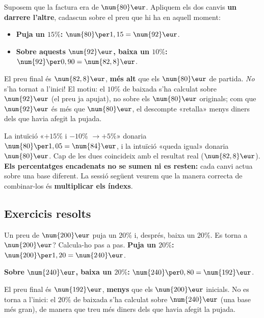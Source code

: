\begin{exemple}
Suposem que la factura era de $\num{80}\eur$. Apliquem els dos canvis \textbf{un
darrere l'altre}, cadascun sobre el preu que hi ha en aquell moment:
\begin{itemize}[leftmargin=1.4em, itemsep=2pt]
  \item \textbf{Puja un $15\%$:} $\num{80}\per 1,15=\num{92}\eur$.
  \item \textbf{Sobre aquests $\num{92}\eur$, baixa un $10\%$:}
        $\num{92}\per 0,90=\num{82,8}\eur$.
\end{itemize}
El preu final és $\num{82,8}\eur$, \textbf{més alt} que els $\num{80}\eur$ de partida.
\emph{No} s'ha tornat a l'inici! El motiu: el $10\%$ de baixada s'ha calculat sobre
$\num{92}\eur$ (el preu ja apujat), no sobre els $\num{80}\eur$ originals; com que
$\num{92}\eur$ és més que $\num{80}\eur$, el descompte «retalla» menys diners dels que
havia afegit la pujada.
\end{exemple}

\begin{exemple}
La intuïció «$+15\%$ i $-10\%$ $\rightarrow +5\%$» donaria
$\num{80}\per 1,05=\num{84}\eur$, i la intuïció «queda igual» donaria $\num{80}\eur$.
Cap de les dues coincideix amb el resultat real ($\num{82,8}\eur$). \textbf{Els
percentatges encadenats no se sumen ni es resten:} cada canvi actua sobre una base
diferent. La sessió següent veurem que la manera correcta de combinar-los és
\textbf{multiplicar els índexs}.
\end{exemple}

\subsection{Exercicis resolts}

\begin{exresolt}
Un preu de $\num{200}\eur$ puja un $20\%$ i, després, baixa un $20\%$. Es torna a
$\num{200}\eur$? Calcula-ho pas a pas.
\solucio
\textbf{Puja un $20\%$:} $\num{200}\per 1,20=\num{240}\eur$.

\textbf{Sobre $\num{240}\eur$, baixa un $20\%$:} $\num{240}\per 0,80=\num{192}\eur$.

El preu final és $\num{192}\eur$, \textbf{menys} que els $\num{200}\eur$ inicials. No
es torna a l'inici: el $20\%$ de baixada s'ha calculat sobre $\num{240}\eur$ (una base
més gran), de manera que treu més diners dels que havia afegit la pujada.
\end{exresolt}

